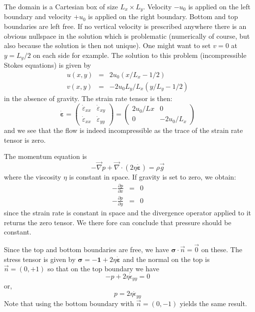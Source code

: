 The domain is a Cartesian box of size $L_x \times L_y$. 
Velocity $-u_0$ is applied on the left boundary and 
velocity $+u_0$ is applied on the right boundary. 
Bottom and top boundaries are left free. 
If no vertical velocity is prescribed anywhere there is an obvious nullspace 
in the solution which is problematic (numerically of course, but also 
because the solution is then not unique). One might want to set $v=0$ at $y=L_y/2$
on each side for example. 
The solution to this problem (incompressible Stokes equations) is given by
\begin{eqnarray}
u(x,y)&=&2u_0(x/L_x-1/2)\\
v(x,y)&=&-2 u_0 L_y/L_x (y/L_y-1/2)
\end{eqnarray}
in the absence of gravity. The strain rate tensor is then:
\[
\dot{\bm \varepsilon} =
\left(
\begin{array}{cc}
\dot{\varepsilon}_{xx} & \dot{\varepsilon}_{xy} \\
\dot{\varepsilon}_{xx} & \dot{\varepsilon}_{yy} 
\end{array}
\right)
=
\left(
\begin{array}{cc}
2 u_0 /Lx & 0 \\
0 & -2 u_0 /L_x 
\end{array}
\right)
\]
and we see that the flow is indeed incompressible as the trace 
of the strain rate tensor is zero. 

The momentum equation is 
\[
-\vec\nabla p + \vec\nabla \cdot (2 \eta \dot{\bm\varepsilon}) = \rho \vec g
\]
where the viscosity $\eta$ is constant in space. 
If gravity is set to zero, we obtain:
\begin{eqnarray}
-\frac{\partial p}{\partial x} &=& 0 \\
-\frac{\partial p}{\partial y} &=& 0 
\end{eqnarray}
since the strain rate is constant in space and the divergence operator applied to it returns 
the zero tensor. We there fore can conclude that pressure should be constant. 

Since the top and bottom boundaries are free, we have ${\bm \sigma}\cdot \vec{n} = \vec{0}$ on these.
The stress tensor is given by ${\bm \sigma} = - {\bm 1} + 2 \eta \dot{\bm \varepsilon}$ and the normal on the 
top is $\vec{n}=(0,+1)$ so that on the top boundary we have
\[
- p + 2 \eta \dot{\epsilon}_{yy} = 0
\]
or, 
\[
p= 2 \eta \dot{\epsilon}_{yy} 
\]
Note that using the bottom boundary with $\vec{n}=(0,-1)$ yields the same result.


\newpage
